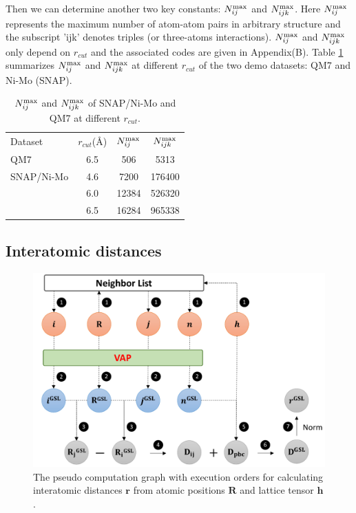 \documentclass[preprint]{revtex4-2}
\begin{document}
Then we can determine another two key constants: $N_{ij}^{\mathrm{max}}$ and $N_{ijk}^{\mathrm{max}}$. 
Here $N_{ij}^{\mathrm{max}}$ represents the maximum number of atom-atom pairs in
arbitrary structure and the subscript 'ijk' denotes triples 
(or three-atoms interactions). $N_{ij}^{\mathrm{max}}$ and $N_{ijk}^{\mathrm{max}}$ only depend on 
$r_{cut}$ and the associated codes are given in Appendix(B). 
Table \ref{table:nij_nijk_max} summarizes $N_{ij}^{\mathrm{max}}$ and $N_{ijk}^{\mathrm{max}}$ at different
$r_{cut}$ of the two demo datasets: QM7 and Ni-Mo (SNAP).

% 
%
\begin{table}[h]
\centering
\begin{tabular}{lccc}
\hline
 Dataset & $r_{cut}$(\AA) & $N_{ij}^{\mathrm{max}}$ & $N_{ijk}^{\mathrm{max}}$ \\
 QM7 & 6.5 & 506 & 5313 \\
\hline
 SNAP/Ni-Mo &  4.6 & 7200 & 176400 \\
 & 6.0 & 12384 & 526320 \\
 & 6.5 & 16284 & 965338 \\
\hline
\hline
\end{tabular}
\caption{\label{table:nij_nijk_max}
$N_{ij}^{\mathrm{max}}$ and $N_{ijk}^{\mathrm{max}}$ of SNAP/Ni-Mo and QM7 at different $r_{cut}$.
}
\end{table}

% 
%
\subsection{Interatomic distances}
\label{section:interatomic_distance}

% 
%
\begin{figure}[h!]
\centering
\includegraphics[scale=0.6]{figures/Fig3.pdf}
\caption{\label{fig:Fig3} The pseudo computation graph with execution orders for 
calculating interatomic distances $\mathbf{r}$ from atomic positions 
$\mathbf{R}$ and lattice tensor $\mathbf{h}$.
}
\end{figure}
\end{document}
